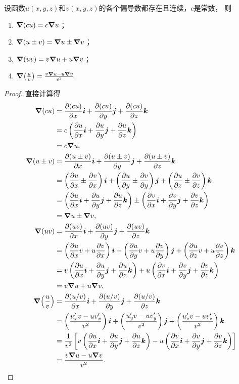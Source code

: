 \begin{theorem}\label{theorem:多元函数微分法.梯度的运算法则}
设函数\(u(x,y,z)\)和\(v(x,y,z)\)的各个偏导数都存在且连续，\(c\)是常数，
则\begin{enumerate}
	\item \(\grad(c u) = c \grad u\)；
	\item \(\grad(u \pm v) = \grad u \pm \grad v\)；
	\item \(\grad(uv) = v \grad u + u \grad v\)；
	\item \(\grad(\frac{u}{v}) = \frac{v \grad u - u \grad v}{v^2}\).
\end{enumerate}
\begin{proof}
\def\gradexpr#1{\pdv{#1}{x} \mat{i} + \pdv{#1}{y} \mat{j} + \pdv{#1}{z} \mat{k}}
直接计算得
\begin{align*}
	\grad(c u)
		&= \gradexpr{(cu)} \\
		&= c \left( \gradexpr{u} \right) \\
		&= c \grad u, \\
	\grad(u \pm v)
		&= \gradexpr{(u \pm v)} \\
		&= \left( \pdv{u}{x} \pm \pdv{v}{x} \right) \mat{i}
		+ \left( \pdv{u}{y} \pm \pdv{v}{y} \right) \mat{j}
		+ \left( \pdv{u}{z} \pm \pdv{v}{z} \right) \mat{k} \\
		&= \left( \gradexpr{u} \right) \pm \left( \gradexpr{v} \right) \\
		&= \grad u \pm \grad v, \\
	\grad(uv)
		&= \gradexpr{(uv)} \\
		&= \left( \pdv{u}{x} v + u \pdv{v}{x} \right) \mat{i}
		+ \left( \pdv{u}{y} v + u \pdv{v}{y} \right) \mat{j}
		+ \left( \pdv{u}{z} v + u \pdv{v}{z} \right) \mat{k} \\
		&= v \left( \gradexpr{u} \right)
		+ u \left( \gradexpr{v} \right) \\
		&= v \grad u + u \grad v, \\
	\grad(\frac{u}{v})
		&= \gradexpr{(u/v)} \\
		&= \left( \frac{u'_x v - u v'_x}{v^2} \right) \mat{i}
		+ \left( \frac{u'_y v - u v'_y}{v^2} \right) \mat{j}
		+ \left( \frac{u'_z v - u v'_z}{v^2} \right) \mat{k} \\
		&= \frac{1}{v^2} \left[
			v \left( \gradexpr{u} \right)
			- u \left( \gradexpr{v} \right)
		\right] \\
		&= \frac{v \grad u - u \grad v}{v^2}.
	\qedhere
\end{align*}
\end{proof}
\end{theorem}

